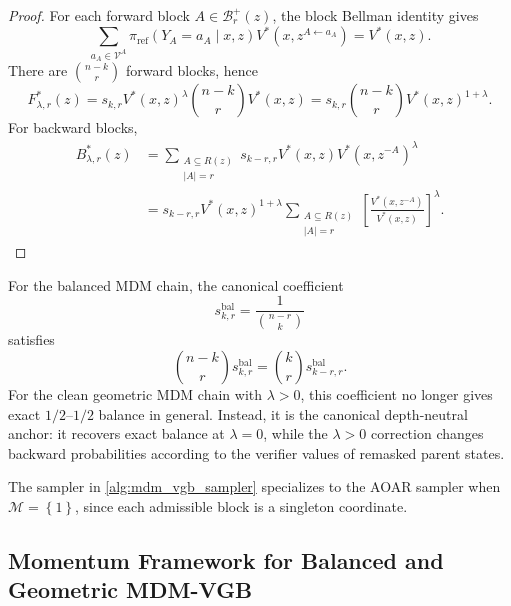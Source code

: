 \documentclass{article}
\numberwithin{theorem}{section}
\numberwithin{proposition}{section}
\numberwithin{corollary}{section}
\numberwithin{lemma}{section}
\numberwithin{conjecture}{section}
\numberwithin{remark}{section}
\numberwithin{definition}{section}
\numberwithin{assumption}{section}
\numberwithin{example}{section}
\newcommand{\calB}{{\mathcal{B}}}
\newcommand{\calM}{{\mathcal{M}}}
\newcommand{\calV}{{\mathcal{V}}}
\newcommand{\mbra}[1]{\left\{#1\right\}}
\newcommand{\abs}[1]{\left| #1\right|}
\providecommand{\base}{\pi_{\mathrm{ref}}}
\begin{document}
\begin{proof}
For each forward block $A\in\calB_r^+(z)$, the block Bellman identity gives
\begin{equation*}
    \sum_{a_A\in\calV^A}\base(Y_A=a_A\mid x,z)V^*(x,z^{A\leftarrow a_A})=V^*(x,z).
\end{equation*}
There are $\binom{n-k}{r}$ forward blocks, hence
\begin{equation*}
    F_{\lambda,r}^*(z)=s_{k,r}V^*(x,z)^\lambda\binom{n-k}{r}V^*(x,z)=s_{k,r}\binom{n-k}{r}V^*(x,z)^{1+\lambda}.
\end{equation*}
For backward blocks,
\begin{align*}
    B_{\lambda,r}^*(z)
    &=\sum_{\substack{A\subseteq R(z)\\\abs{A}=r}}s_{k-r,r}V^*(x,z)V^*(x,z^{-A})^\lambda\\
    &=s_{k-r,r}V^*(x,z)^{1+\lambda}\sum_{\substack{A\subseteq R(z)\\\abs{A}=r}}
    \left[\frac{V^*(x,z^{-A})}{V^*(x,z)}\right]^\lambda.
\end{align*}
\end{proof}

\begin{remark}
\label{rem:bg_mdm_canonical_anchor}
For the balanced MDM chain, the canonical coefficient
\begin{equation*}
    s_{k,r}^{\mathrm{bal}}=\frac{1}{\binom{n-r}{k}}
\end{equation*}
satisfies
\begin{equation*}
    \binom{n-k}{r}s_{k,r}^{\mathrm{bal}}=\binom{k}{r}s_{k-r,r}^{\mathrm{bal}}.
\end{equation*}
For the clean geometric MDM chain with $\lambda>0$, this coefficient no longer gives exact $1/2$--$1/2$ balance in general. Instead, it is the canonical depth-neutral anchor: it recovers exact balance at $\lambda=0$, while the $\lambda>0$ correction changes backward probabilities according to the verifier values of remasked parent states.
\end{remark}

The sampler in \cref{alg:mdm_vgb_sampler} specializes to the AOAR sampler
when $\calM=\mbra{1}$, since each admissible block is a singleton coordinate.


\subsection{Momentum Framework for Balanced and Geometric MDM-VGB}
\label{app:subsec:momentum_bg_mdm_vgb}
\label{app:subsec:momentum_balanced_mdm_vgb}
\label{app:subsubsec:balanced_mdm_momentum}
\end{document}
